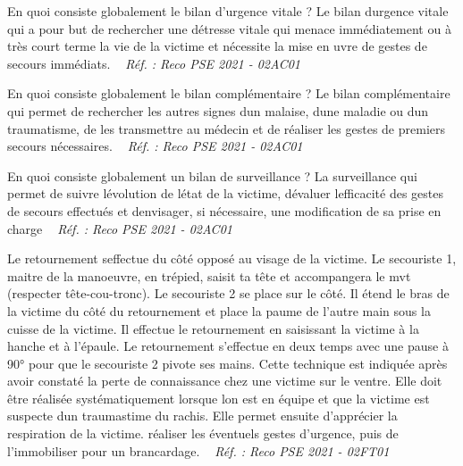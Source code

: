 \documentclass[grid,avery5371,landscape]{flashcards}
\makeatletter
\newcounter{nocarte}
\newcommand{\categ}[1]{%
  \def\@categ{#1}%
  \setcounter{nocarte}{0}%
}
\newcommand{\source}[1]{%
  \medskip
  \itshape%
   ~ \hfill Réf. : #1}
\makeatother
\begin{document}
\color[HTML]{003273}
\categ{PSE}
\begin{flashcard}[bilan]{
 En quoi consiste globalement le bilan d'urgence vitale ?   }
  Le bilan durgence vitale qui a pour but de rechercher une détresse vitale qui menace immédiatement ou à très court terme la vie de la victime et nécessite la mise en uvre de gestes de secours immédiats.
  \source{Reco PSE 2021 - 02AC01}
\end{flashcard}


\color[HTML]{003273}
\categ{PSE}
\begin{flashcard}[bilan]{
 En quoi consiste globalement le bilan complémentaire ?   }
  Le bilan complémentaire qui permet de rechercher les autres signes dun malaise, dune maladie ou dun traumatisme, de les transmettre au médecin et de réaliser les gestes de premiers secours nécessaires.
  \source{Reco PSE 2021 - 02AC01}
\end{flashcard}


\color[HTML]{003273}
\categ{PSE}
\begin{flashcard}[bilan]{
 En quoi consiste globalement un bilan de surveillance ?   }
  La surveillance qui permet de suivre lévolution de létat de la victime, dévaluer lefficacité des gestes de secours effectués et denvisager, si nécessaire, une modification de sa prise en charge
  \source{Reco PSE 2021 - 02AC01}
\end{flashcard}


\color[HTML]{003273}
\categ{PSE}
\begin{flashcard}[geste]{
 Le retournement seffectue du côté opposé au visage de la victime.
Le secouriste 1, maitre de la manoeuvre,  en trépied, saisit ta tête  et accompangera le mvt (respecter tête-cou-tronc).
Le secouriste 2 se place sur le côté. Il étend le bras de la victime du côté du retournement et place la paume de l'autre main sous la cuisse de la victime. Il effectue le retournement en saisissant la victime à la hanche et à l'épaule. 
Le retournement s'effectue en deux temps avec une pause à 90° pour que le secouriste 2 pivote ses mains.   }
  Cette technique est indiquée après avoir constaté la perte de connaissance chez une victime sur le ventre.
Elle doit être réalisée systématiquement lorsque lon est en équipe et que la victime est suspecte dun traumastime du rachis.
Elle permet ensuite d'apprécier la respiration de la victime. réaliser les éventuels gestes d'urgence, puis de l'immobiliser pour un brancardage.
  \source{Reco PSE 2021 - 02FT01}
\end{flashcard}
\end{document}
